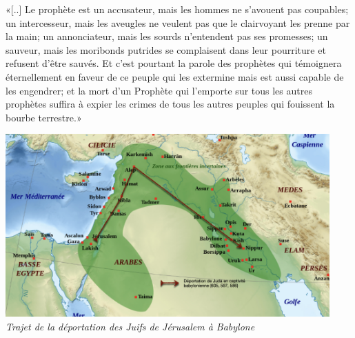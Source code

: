 \decalage «[..] Le prophète est un accusateur, mais les hommes ne s'avouent pas coupables; un intercesseur, mais les aveugles ne veulent pas que le clairvoyant les prenne par la main; un annonciateur, mais les sourds n'entendent pas ses promesses; un sauveur, mais les moribonds putrides se complaisent dans leur pourriture et refusent d'être sauvés. Et c'est pourtant la parole des prophètes qui témoignera éternellement en faveur de ce peuple qui les extermine mais est aussi capable de les engendrer; et la mort d'un Prophète qui l'emporte sur tous les autres prophètes suffira à expier les crimes de tous les autres peuples qui fouissent la bourbe terrestre.»\par
\vspace{1.5em}
\begin{center}
\includegraphics[height=7cm]{../assets/deportation.jpg} \\
\textit{Trajet de la déportation des Juifs de Jérusalem à Babylone}
\end{center}
